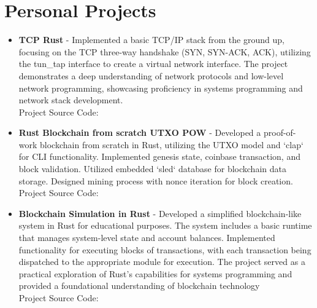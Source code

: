 \documentclass[11pt,a4paper,sans]{moderncv}
\begin{document}

\section{Personal Projects}
\begin{itemize}[label=\textbullet]
  \item \textbf{TCP Rust} - Implemented a basic TCP/IP stack from the
    ground up, focusing on the TCP three-way handshake (SYN, SYN-ACK,
    ACK), utilizing the tun\_tap interface to create a virtual
    network interface. The project demonstrates a deep understanding
    of network protocols and low-level network programming,
    showcasing proficiency in systems programming and network stack
    development. \\
    Project Source Code:
    \textcolor{blue}
    {\href{https://github.com/noormohammedb/rust-tcp-implementation/}
      {}}

  \item \textbf{Rust Blockchain from scratch UTXO POW} - Developed a
    proof-of-work blockchain from scratch in Rust, utilizing the UTXO
    model and `clap` for CLI functionality. Implemented genesis
    state, coinbase transaction, and block validation. Utilized
    embedded `sled` database for blockchain data storage. Designed
    mining process with nonce iteration for block creation. \\
    Project Source Code:
    \textcolor{blue}
    {
      \href{
        https://github.com/noormohammedb/blockchain-pow-from-scratch-rust-utxo/
      }
      {
      }
    }

  \item \textbf{Blockchain Simulation in Rust} - Developed a
    simplified blockchain-like system in Rust for educational
    purposes. The system includes a basic runtime that manages
    system-level state and account balances. Implemented
    functionality for executing blocks of transactions, with each
    transaction being dispatched to the appropriate module for
    execution. The project served as a practical exploration of
    Rust’s capabilities for systems programming and provided a
    foundational understanding of blockchain technology  \\
    Project Source Code:
    \textcolor{blue}{
      \href{https://github.com/noormohammedb/rust-state-machine/}{}
    }

\end{itemize}
\end{document}
